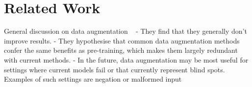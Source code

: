 \section{Related Work}
\label{sec:relate}

\begin{comment}
* Applications of perturbations
** As augmentation
- ICLR paper
- contrast set
- other two papers

** As explanation
- Perturbation

* Text generation
- Controlled style transfer
- Special tokens, finetuning gpt-2
- blank

\end{comment}



\begin{comment}

*** errudite 

Counterfactual attacks to models have taken various forms, e.g., by adding distracting sentences to the context in MC~\cite{jia2017adversarial}, or feeding partial questions or wrong images into models~\cite{agrawal2016analyzing, mudrakarta2018did, feng2018pathologies}. 
Slightly closer to our work is SEARs~\cite{ribeiro2018semantically} (also incorporated into QADiver), which also takes the form of rewrite rules: it generates semantic-preserving rules that cause models to change predictions.
However, these focus on robustness, i.e., counterfactual perturbations are mainly for the purpose of detecting over-stability or over-sensitivity.
In contrast, our counterfactual analysis is for the purpose of understanding \emph{why} models fail in certain groups. Furthermore, our DSL allows for more complex counterfactual rules and for applying rules only to certain groups, such as ``delete the predicted distractor for instances in the \texttt{is\_distracted} group.''
As far as we know, such analysis is novel, and a promising direction for more in-depth error analysis.

\end{comment}

General discussion on data augmentation
~\citet{longpre2020effective}
- They find that they generally don’t improve results. 
- They hypothesise that common data augmentation methods confer the same benefits as pre-training, which makes them largely redundant with current methods. 
- In the future, data augmentation may be most useful for settings where current models fail or that currently represent blind spots. Examples of such settings are negation or malformed input~\cite{rogers2020primer, ettinger2020bert}

